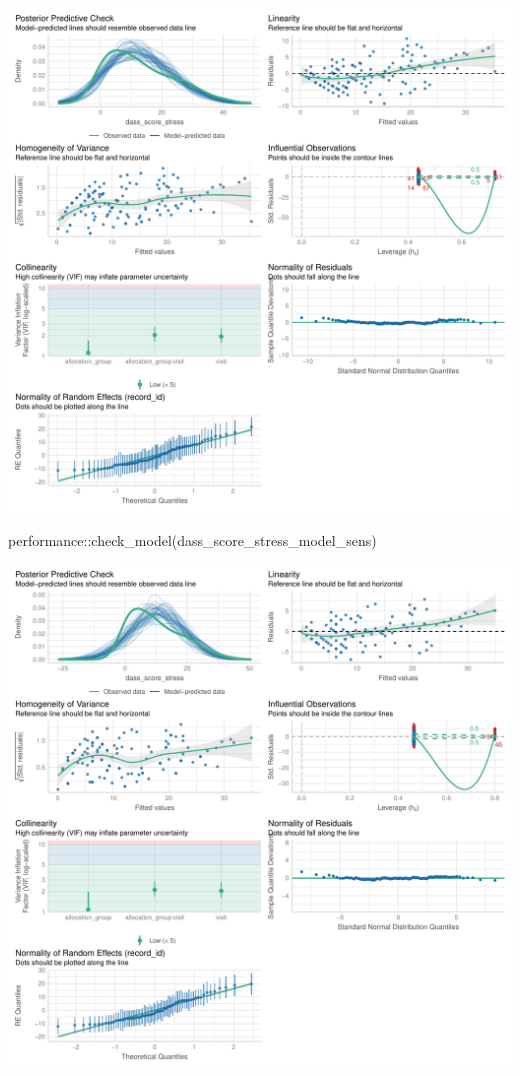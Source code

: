 \documentclass[
  letterpaper,
  DIV=11,
  numbers=noendperiod]{scrartcl}
\newenvironment{Shaded}{\begin{snugshade}}{\end{snugshade}}
\newcommand{\FunctionTok}[1]{\textcolor[rgb]{0.28,0.35,0.67}{#1}}
\newcommand{\NormalTok}[1]{\textcolor[rgb]{0.00,0.23,0.31}{#1}}
\newcommand{\SpecialCharTok}[1]{\textcolor[rgb]{0.37,0.37,0.37}{#1}}
\begin{document}
\includegraphics{Outcomes_V1V2V3_files/figure-pdf/dass_score_stress_4-1.pdf}

\begin{Shaded}
\begin{Highlighting}[]
\NormalTok{performance}\SpecialCharTok{::}\FunctionTok{check\_model}\NormalTok{(dass\_score\_stress\_model\_sens)}
\end{Highlighting}
\end{Shaded}

\includegraphics{Outcomes_V1V2V3_files/figure-pdf/dass_score_stress_4-2.pdf}
\end{document}
